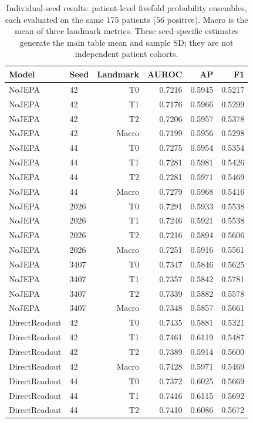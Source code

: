 \begin{table}[t]
\centering
\small
\caption{Individual-seed results: patient-level fivefold probability ensembles, each evaluated on the same 175 patients (56 positive). Macro is the mean of three landmark metrics. These seed-specific estimates generate the main table mean and sample SD; they are not independent patient cohorts.}
\label{tab:seedresults}
\begin{tabular}{llrrrr}
\toprule
Model & Seed & Landmark & AUROC & AP & F1 \\
\midrule
NoJEPA & 42 & T0 & 0.7216 & 0.5945 & 0.5217 \\
NoJEPA & 42 & T1 & 0.7176 & 0.5966 & 0.5299 \\
NoJEPA & 42 & T2 & 0.7206 & 0.5957 & 0.5378 \\
NoJEPA & 42 & Macro & 0.7199 & 0.5956 & 0.5298 \\
NoJEPA & 44 & T0 & 0.7275 & 0.5954 & 0.5354 \\
NoJEPA & 44 & T1 & 0.7281 & 0.5981 & 0.5426 \\
NoJEPA & 44 & T2 & 0.7281 & 0.5971 & 0.5469 \\
NoJEPA & 44 & Macro & 0.7279 & 0.5968 & 0.5416 \\
NoJEPA & 2026 & T0 & 0.7291 & 0.5933 & 0.5538 \\
NoJEPA & 2026 & T1 & 0.7246 & 0.5921 & 0.5538 \\
NoJEPA & 2026 & T2 & 0.7216 & 0.5894 & 0.5606 \\
NoJEPA & 2026 & Macro & 0.7251 & 0.5916 & 0.5561 \\
NoJEPA & 3407 & T0 & 0.7347 & 0.5846 & 0.5625 \\
NoJEPA & 3407 & T1 & 0.7357 & 0.5842 & 0.5781 \\
NoJEPA & 3407 & T2 & 0.7339 & 0.5882 & 0.5578 \\
NoJEPA & 3407 & Macro & 0.7348 & 0.5857 & 0.5661 \\
DirectReadout & 42 & T0 & 0.7435 & 0.5881 & 0.5321 \\
DirectReadout & 42 & T1 & 0.7461 & 0.6119 & 0.5487 \\
DirectReadout & 42 & T2 & 0.7389 & 0.5914 & 0.5600 \\
DirectReadout & 42 & Macro & 0.7428 & 0.5971 & 0.5469 \\
DirectReadout & 44 & T0 & 0.7372 & 0.6025 & 0.5669 \\
DirectReadout & 44 & T1 & 0.7416 & 0.6115 & 0.5692 \\
DirectReadout & 44 & T2 & 0.7410 & 0.6086 & 0.5672 \\

\end{tabular}
\end{table}
